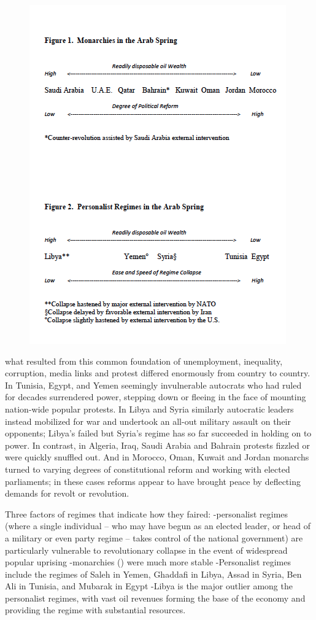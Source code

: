     \begin{figure}[h]
        \centering
        \includegraphics[width=.8\textwidth]{goldstone_2013_ssrn.png}
        \caption{\cite{goldstone_bringing_2013}}
        \label{fig:init_res}
    \end{figure}  

what resulted from this common foundation of unemployment, inequality, corruption, media links and protest differed enormously from country to country. In Tunisia, Egypt, and Yemen seemingly invulnerable autocrats who had ruled for decades surrendered power, stepping down or fleeing in the face of mounting nation-wide popular protests. In Libya and Syria similarly autocratic leaders instead mobilized for war and undertook an all-out military assault on their opponents; Libya’s failed but Syria’s regime has so far succeeded in holding on to power. In contrast, in Algeria, Iraq, Saudi Arabia and Bahrain protests fizzled or were quickly snuffled out. And in Morocco, Oman, Kuwait and Jordan monarchs turned to varying degrees of constitutional reform and working with elected parliaments; in these cases reforms appear to have brought peace by deflecting demands for revolt or revolution.

Three factors of regimes that indicate how they faired:
-personalist regimes (where a single individual – who may have begun as an elected leader, or head of a military or even party regime – takes control of the national government) are particularly vulnerable to revolutionary collapse in the event of widespread popular uprising
    -monarchies () were much more stable
    -Personalist regimes include the regimes of Saleh in Yemen, Ghaddafi in Libya, Assad in Syria, Ben Ali in Tunisia, and Mubarak in Egypt
    -Libya is the major outlier among the personalist regimes, with vast oil revenues forming the base of the economy and providing the regime with substantial resources.
    
